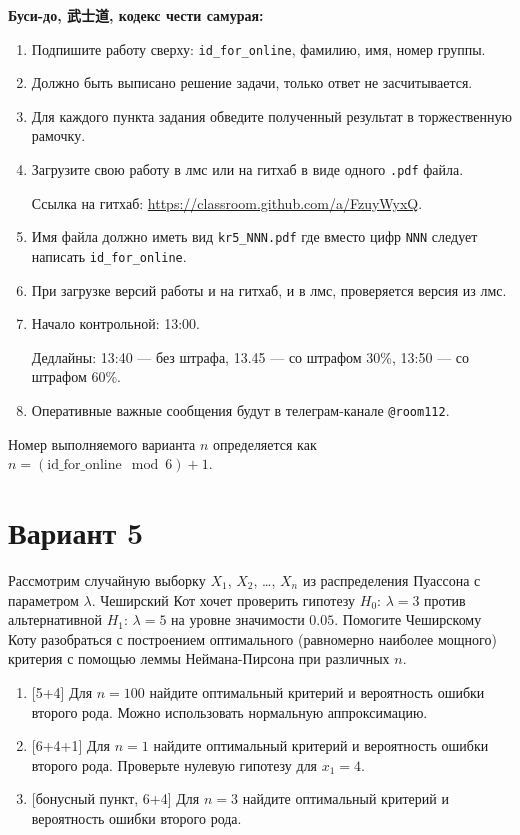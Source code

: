 \documentclass[12pt]{article}
\newcommand \id {\mathrm{id}\_\mathrm{for}\_\mathrm{online}}
\begin{document}
\vspace{15mm}


\textbf{Буси-до, 武士道, кодекс чести самурая:}

\vspace{5mm}

\begin{enumerate}
\item Подпишите работу сверху: \verb|id_for_online|, фамилию, имя, номер группы.
\item Должно быть выписано решение задачи, только ответ не засчитывается.
\item Для каждого пункта задания обведите полученный результат в торжественную рамочку.
\item Загрузите свою работу в лмс или на гитхаб в виде одного \verb|.pdf| файла.

Ссылка на гитхаб: \url{https://classroom.github.com/a/FzuyWyxQ}.
\item Имя файла должно иметь вид \verb|kr5_NNN.pdf| где вместо цифр \verb|NNN| следует написать \verb|id_for_online|.
\item При загрузке версий работы и на гитхаб, и в лмс, проверяется версия из лмс. 
\item Начало контрольной: 13:00. 

Дедлайны: 13:40 — без штрафа, 13.45 — со штрафом 30\%, 13:50 — со штрафом 60\%.
\item Оперативные важные сообщения будут в телеграм-канале \verb|@room112|.
\end{enumerate}


\newpage

Номер выполняемого варианта $n$ определяется как $n=(\id \mod 6)+1$. 

\section*{Вариант 5}


Рассмотрим случайную выборку $X_1$, $X_2$, \ldots, $X_n$ из распределения Пуассона с параметром $\lambda$. 
Чеширский Кот хочет проверить гипотезу $H_0$: $\lambda = 3$ против альтернативной $H_1$: $\lambda = 5$ на уровне
значимости $0.05$. Помогите Чеширскому Коту разобраться с построением оптимального (равномерно наиболее мощного)
критерия с помощью леммы Неймана-Пирсона при различных $n$.

\begin{enumerate}
  \item {[5+4]} Для $n=100$ найдите оптимальный критерий и вероятность ошибки второго рода. Можно использовать нормальную аппроксимацию.
  \item {[6+4+1]} Для $n=1$ найдите оптимальный критерий и вероятность ошибки второго рода. Проверьте нулевую гипотезу для $x_1 = 4$. 
  \item {[бонусный пункт, 6+4]} Для $n=3$ найдите оптимальный критерий и вероятность ошибки второго рода.
\end{enumerate}
\end{document}
